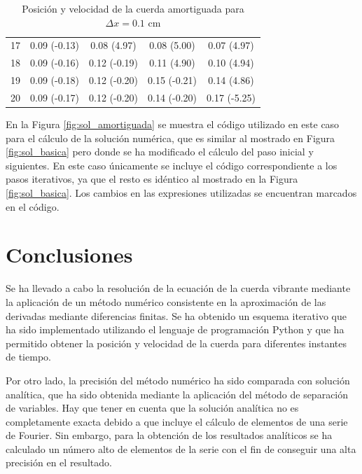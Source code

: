 \documentclass[11pt]{article}
\begin{document}
\begin{table}
\begin{small}
\begin{tabular}{ c c c c c }
17 & 0.09 (-0.13) & 0.08 (4.97) & 0.08 (5.00) & 0.07 (4.97) \\
18 & 0.09 (-0.16) & 0.12 (-0.19) & 0.11 (4.90) & 0.10 (4.94) \\
19 & 0.09 (-0.18) & 0.12 (-0.20) & 0.15 (-0.21) & 0.14 (4.86) \\
20 & 0.09 (-0.17) & 0.12 (-0.20) & 0.14 (-0.20) & 0.17 (-5.25) \\
\end{tabular}
\end{small}
\caption{Posición y velocidad de la cuerda amortiguada para $\Delta{x} = 0.1$ cm}
\label{tab:est_velocidad_amortiguado}
\end{table}

En la Figura \ref{fig:sol_amortiguada} se muestra el código utilizado en este caso para el
cálculo de la solución numérica, que es similar al mostrado en Figura \ref{fig:sol_basica}
pero donde se ha modificado el cálculo del paso inicial y siguientes. En este caso
únicamente se incluye el código correspondiente a los pasos iterativos, ya que el resto
es idéntico al mostrado en la Figura \ref{fig:sol_basica}. Los cambios en las expresiones
utilizadas se encuentran marcados en el código.

\section{Conclusiones}
Se ha llevado a cabo la resolución de la ecuación de la cuerda vibrante mediante la
aplicación de un método numérico consistente en la aproximación de las derivadas mediante
diferencias finitas. Se ha obtenido un esquema iterativo que ha sido implementado utilizando
el lenguaje de programación Python y que ha permitido obtener la posición y velocidad de
la cuerda para diferentes instantes de tiempo.

Por otro lado, la precisión del método numérico ha sido comparada con solución analítica,
que ha sido obtenida mediante la aplicación del método de separación de variables. Hay que
tener en cuenta que la solución analítica no es completamente exacta debido a que incluye
el cálculo de elementos de una serie de Fourier. Sin embargo, para la obtención de los
resultados analíticos se ha calculado un número alto de elementos de la serie con el fin
de conseguir una alta precisión en el resultado.
\end{document}
